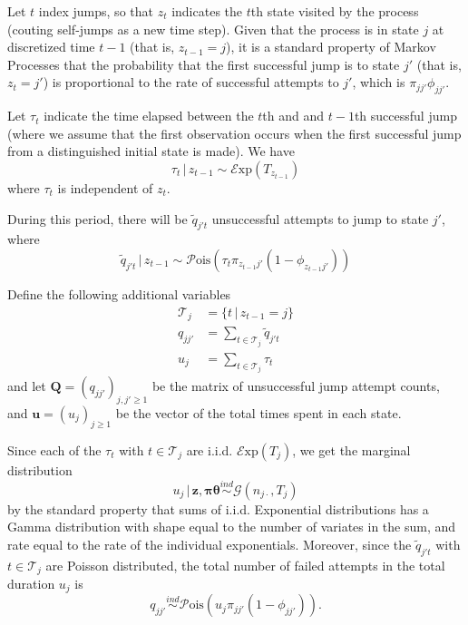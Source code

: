 \documentclass[12pt,letterpaper]{report}
\newcommand{\Pois}[1]{\mathcal{P}\mathrm{ois}(#1)}
\newcommand{\Exp}[1]{\mathcal{E}\mathrm{xp}(#1)}
\newcommand{\Gamm}[2]{\mathcal{G}(#1,#2)}
\newcommand{\given}{\, \vert \,}
\newcommand{\bQ}{\mathbf{Q}}
\newcommand{\bz}{\mathbf{z}}
\newcommand{\bu}{\mathbf{u}}
\newcommand{\btheta}{\boldsymbol{\theta}}
\newcommand{\bpi}{\boldsymbol{\pi}}
\begin{document}
Let $t$ index jumps, so that $z_t$ indicates the $t$th state visited
by the process (couting self-jumps as a new time step).  Given
that the process is in state $j$ at discretized time $t-1$ (that is,
$z_{t-1} = j$), it is a standard property of Markov Processes that 
the probability that the first successful jump is to state $j'$ (that is, $z_{t} = j'$) 
is proportional to the rate of successful attempts to 
$j'$, which is $\pi_{jj'}\phi_{jj'}$.  

Let $\tau_{t}$ indicate the time elapsed between the $t$th and 
and $t-1$th successful jump (where we assume that the first
observation occurs when the first successful jump from a distinguished initial
state is made).  We have
\begin{equation}
  \label{eq:52}
  \tau_t \given z_{t-1} \sim \Exp{T_{z_{t-1}}}
\end{equation}
where $\tau_t$ is independent of $z_{t}$.

During this period, there will be $\tilde{q}_{j't}$ unsuccessful attempts to
jump to state $j'$, where
\begin{equation}
  \label{eq:53}
  \tilde{q}_{j't} \given z_{t-1} \sim \Pois{\tau_t \pi_{z_{t-1}j'}(1-\phi_{z_{t-1}j'})}
\end{equation}

Define the following additional variables
\begin{align}
  \label{eq:56}
    \mathcal{T}_j &= \{t \given z_{t-1} = j\} \\
    q_{jj'} &= \sum_{t \in \mathcal{T}_j}
    \tilde{q}_{j't} \\
    u_j &= \sum_{t \in \mathcal{T}_j} \tau_t 
\end{align}
and let $\bQ = (q_{jj'})_{j,j' \geq 1}$ be the matrix of unsuccessful
jump attempt counts, and $\bu = (u_j)_{j \geq 1}$ be the vector of
the total times spent in each state.

Since each of the $\tau_t$ with $t \in \mathcal{T}_j$ are
i.i.d. $\Exp{T_j}$, we get the marginal distribution
\begin{equation}
u_j \given \bz, \bpi \btheta \stackrel{ind}{\sim} \Gamm{n_{j\cdot}}{T_j}
\end{equation}
by the standard property that sums of i.i.d. Exponential distributions
has a Gamma distribution with shape equal to the number of variates in
the sum, and rate equal to the rate of the individual exponentials.  
Moreover, since the $\tilde{q}_{j't}$ with $t \in \mathcal{T}_j$ 
are Poisson distributed, the total number of failed
attempts in the total duration $u_j$ is
\begin{equation}
  \label{eq:60}
  q_{jj'} \stackrel{ind}{\sim} \Pois{u_j\pi_{jj'}(1-\phi_{jj'})}.
\end{equation}
\end{document}
